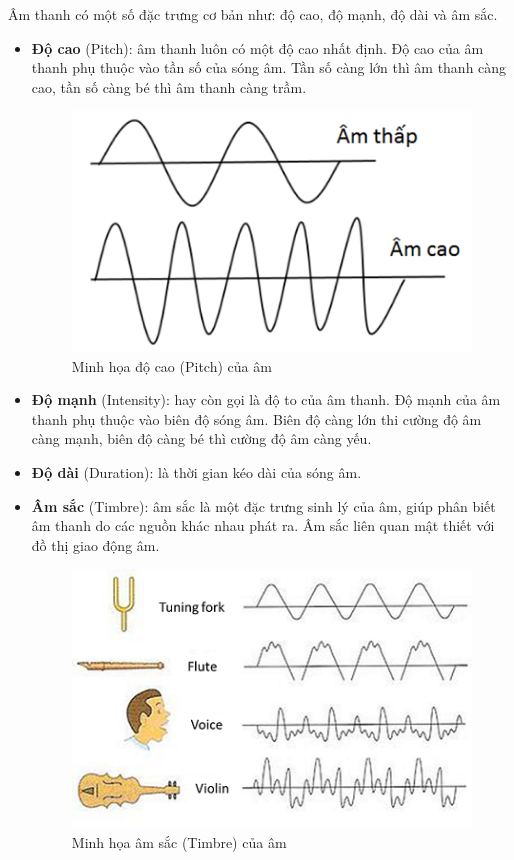 Âm thanh có một số đặc trưng cơ bản như: độ cao, độ mạnh, độ dài và âm sắc.
\begin{itemize}
	\item \textbf{Độ cao} (Pitch): âm thanh luôn có một độ cao nhất định. Độ cao của âm thanh phụ thuộc vào tần số của sóng âm. Tần số càng lớn thì âm thanh càng cao, tần số càng bé thì âm thanh càng trầm.

	\begin{figure}[h]
		\centering
		\includegraphics[scale=1]{pitch}
		\caption{Minh họa độ cao (Pitch) của âm}
		\label{fig:c2_pitch}
	\end{figure}

	\item \textbf{Độ mạnh} (Intensity): hay còn gọi là độ to của âm thanh. Độ mạnh của âm thanh phụ thuộc vào biên độ sóng âm. Biên độ càng lớn thi cường độ âm càng mạnh, biên độ càng bé thì cường độ âm càng yếu.
	\item \textbf{Độ dài} (Duration): là thời gian kéo dài của sóng âm.
	\item \textbf{Âm sắc} (Timbre): âm sắc là một đặc trưng sinh lý của âm, giúp phân biết âm thanh do các nguồn khác nhau phát ra. Âm sắc liên quan mật thiết với đồ thị giao động âm.
	\begin{figure}[h]
		\centering
		\includegraphics[scale=1]{timbre}
		\caption{Minh họa âm sắc (Timbre) của âm}
		\label{fig:c2_timbre}
	\end{figure}
\end{itemize}

